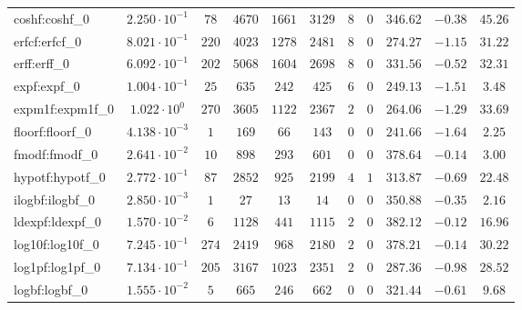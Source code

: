 \begin{tabular}{|l|c|c|c|c|c|c|c|c|c|c|}
coshf:coshf\_0               & $ 2.250 \cdot 10^{-1} $ & $ 78     $ & $ 4670  $ & $ 1661  $ & $ 3129  $ & $ 8   $ & $ 0 $ & $ 346.62      $ & $ -0.38   $ & $ 45.26   $ \\
erfcf:erfcf\_0               & $ 8.021 \cdot 10^{-1} $ & $ 220    $ & $ 4023  $ & $ 1278  $ & $ 2481  $ & $ 8   $ & $ 0 $ & $ 274.27      $ & $ -1.15   $ & $ 31.22   $ \\
erff:erff\_0                 & $ 6.092 \cdot 10^{-1} $ & $ 202    $ & $ 5068  $ & $ 1604  $ & $ 2698  $ & $ 8   $ & $ 0 $ & $ 331.56      $ & $ -0.52   $ & $ 32.31   $ \\
expf:expf\_0                 & $ 1.004 \cdot 10^{-1} $ & $ 25     $ & $ 635   $ & $ 242   $ & $ 425   $ & $ 6   $ & $ 0 $ & $ 249.13      $ & $ -1.51   $ & $ 3.48    $ \\
expm1f:expm1f\_0             & $ 1.022 \cdot 10^{0}  $ & $ 270    $ & $ 3605  $ & $ 1122  $ & $ 2367  $ & $ 2   $ & $ 0 $ & $ 264.06      $ & $ -1.29   $ & $ 33.69   $ \\
floorf:floorf\_0             & $ 4.138 \cdot 10^{-3} $ & $ 1      $ & $ 169   $ & $ 66    $ & $ 143   $ & $ 0   $ & $ 0 $ & $ 241.66      $ & $ -1.64   $ & $ 2.25    $ \\
fmodf:fmodf\_0               & $ 2.641 \cdot 10^{-2} $ & $ 10     $ & $ 898   $ & $ 293   $ & $ 601   $ & $ 0   $ & $ 0 $ & $ 378.64      $ & $ -0.14   $ & $ 3.00    $ \\
hypotf:hypotf\_0             & $ 2.772 \cdot 10^{-1} $ & $ 87     $ & $ 2852  $ & $ 925   $ & $ 2199  $ & $ 4   $ & $ 1 $ & $ 313.87      $ & $ -0.69   $ & $ 22.48   $ \\
ilogbf:ilogbf\_0             & $ 2.850 \cdot 10^{-3} $ & $ 1      $ & $ 27    $ & $ 13    $ & $ 14    $ & $ 0   $ & $ 0 $ & $ 350.88      $ & $ -0.35   $ & $ 2.16    $ \\
ldexpf:ldexpf\_0             & $ 1.570 \cdot 10^{-2} $ & $ 6      $ & $ 1128  $ & $ 441   $ & $ 1115  $ & $ 2   $ & $ 0 $ & $ 382.12      $ & $ -0.12   $ & $ 16.96   $ \\
log10f:log10f\_0             & $ 7.245 \cdot 10^{-1} $ & $ 274    $ & $ 2419  $ & $ 968   $ & $ 2180  $ & $ 2   $ & $ 0 $ & $ 378.21      $ & $ -0.14   $ & $ 30.22   $ \\
log1pf:log1pf\_0             & $ 7.134 \cdot 10^{-1} $ & $ 205    $ & $ 3167  $ & $ 1023  $ & $ 2351  $ & $ 2   $ & $ 0 $ & $ 287.36      $ & $ -0.98   $ & $ 28.52   $ \\
logbf:logbf\_0               & $ 1.555 \cdot 10^{-2} $ & $ 5      $ & $ 665   $ & $ 246   $ & $ 662   $ & $ 0   $ & $ 0 $ & $ 321.44      $ & $ -0.61   $ & $ 9.68    $ \\

\end{tabular}
